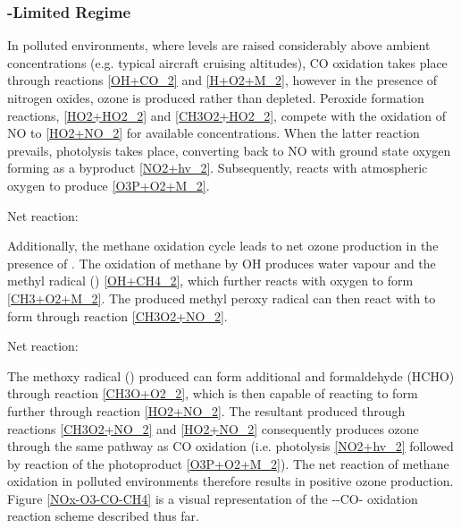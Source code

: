 \subsubsection{-Limited Regime}
In polluted environments, where  levels are raised considerably above ambient concentrations (e.g. typical aircraft cruising altitudes), CO oxidation takes place through reactions \eqref{OH+CO_2} and \eqref{H+O2+M_2}, however in the presence of nitrogen oxides, ozone is produced rather than depleted. Peroxide formation reactions, \eqref{HO2+HO2_2} and \eqref{CH3O2+HO2_2}, compete with the oxidation of NO to  \eqref{HO2+NO_2} for available  concentrations. When the latter reaction prevails,  photolysis takes place, converting back to NO with ground state oxygen  forming as a byproduct \eqref{NO2+hv_2}. Subsequently,  reacts with atmospheric oxygen to produce  \eqref{O3P+O2+M_2}.




Net reaction: 

Additionally, the methane oxidation cycle leads to net ozone production in the presence of . The oxidation of methane by OH produces water vapour and the methyl radical () \eqref{OH+CH4_2}, which further reacts with oxygen to form  \eqref{CH3+O2+M_2}. The produced methyl peroxy radical can then react with  to form  through reaction \eqref{CH3O2+NO_2}.





Net reaction: 

The methoxy radical () produced can form additional  and formaldehyde (HCHO) through reaction \eqref{CH3O+O2_2}, which is then capable of reacting to form further  through reaction \eqref{HO2+NO_2}. The resultant  produced through reactions \eqref{CH3O2+NO_2} and \eqref{HO2+NO_2} consequently produces ozone through the same pathway as CO oxidation (i.e.  photolysis \eqref{NO2+hv_2} followed by reaction of the  photoproduct \eqref{O3P+O2+M_2}). The net reaction of methane oxidation in polluted environments therefore results in positive ozone production. Figure \ref{NOx-O3-CO-CH4} is a visual representation of the --CO- oxidation reaction scheme described thus far.

